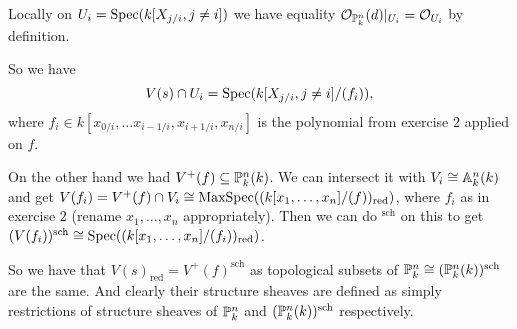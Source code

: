 \begin{exercise}{3}
\begin{enumerate}
{                Locally on $U_i = \operatorname{Spec}(k[X_{j/i}, j \not= i])$ we have equality
                $\mathcal{O}_{\mathbb{P}^n_k}(d)|_{U_i} = \mathcal{O}_{U_i}$ by
                definition.

                So we have
                \begin{equation*}
                    V(s) \cap U_i = \operatorname{Spec}(k[X_{j/i}, j \not= i] / (f_i)),
                \end{equation*}
                where $f_i \in k[x_{0/i}, \dots x_{i-1/i}, x_{i+1/i}, x_{n/i}]$
                is the polynomial from exercise $2$ applied on $f$.

                On the other hand we had $V^+(f) \subseteq \mathbb{P}^n_k(k)$. We can
                intersect it with $V_i \cong \mathbb{A}^n_k(k)$ and get $V(f_i) =
                V^+(f) \cap V_i \cong \operatorname{MaxSpec}((k[x_1, \dots,
                x_n]/(f))_{\text{red}})$, where $f_i$ as in exercise $2$ (rename
                $x_1, \dots, x_n$ appropriately). Then we can do $^{\text{sch}}$
                on this to get $(V(f_i))^{\text{sch}} \cong \operatorname{Spec}((k[x_1, \dots,
                x_n]/(f_i))_{\text{red}})$.

                So we have that $V(s)_{\text{red}} = V^+(f)^{\text{sch}}$ as
                topological subsets of $\mathbb{P}^n_k \cong
                (\mathbb{P}^n_k(k))^{\text{sch}}$ are the same. And clearly their
                structure sheaves are defined as simply restrictions of
                structure sheaves of $\mathbb{P}^n_k$ and
                $(\mathbb{P}^n_k(k))^{\text{sch}}$ respectively.
            }
    \end{enumerate}
\end{exercise}

